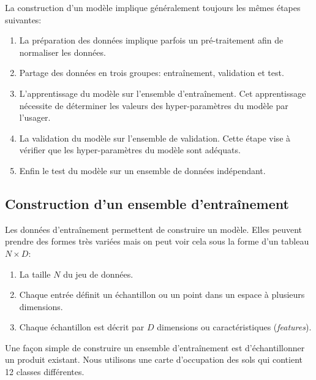 \documentclass[
  french,
  11pt,
  letterpaper,
  open=any,
  twoside=false,
  french]{scrbook}
\begin{document}
La construction d'un modèle implique généralement toujours les mêmes
étapes suivantes:

\begin{enumerate}
\def\labelenumi{\arabic{enumi}.}
\item
  La préparation des données implique parfois un pré-traitement afin de
  normaliser les données.
\item
  Partage des données en trois groupes: entraînement, validation et
  test.
\item
  L'apprentissage du modèle sur l'ensemble d'entraînement. Cet
  apprentissage nécessite de déterminer les valeurs des hyper-paramètres
  du modèle par l'usager.
\item
  La validation du modèle sur l'ensemble de validation. Cette étape vise
  à vérifier que les hyper-paramètres du modèle sont adéquats.
\item
  Enfin le test du modèle sur un ensemble de données indépendant.
\end{enumerate}

\subsection{Construction d'un ensemble
d'entraînement}\label{sec-05.02.02}

Les données d'entraînement permettent de construire un modèle. Elles
peuvent prendre des formes très variées mais on peut voir cela sous la
forme d'un tableau \(N \times D\):

\begin{enumerate}
\def\labelenumi{\arabic{enumi}.}
\item
  La taille \(N\) du jeu de données.
\item
  Chaque entrée définit un échantillon ou un point dans un espace à
  plusieurs dimensions.
\item
  Chaque échantillon est décrit par \(D\) dimensions ou caractéristiques
  (\emph{features}).
\end{enumerate}

Une façon simple de construire un ensemble d'entraînement est
d'échantillonner un produit existant. Nous utilisons une carte
d'occupation des sols qui contient 12 classes différentes.
\end{document}
